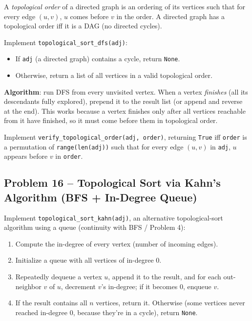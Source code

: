 \documentclass[11pt]{article}
\begin{document}
A \emph{topological order} of a directed graph is an ordering of its vertices such that
for every edge $(u,v)$, $u$ comes before $v$ in the order. A directed graph has a
topological order iff it is a DAG (no directed cycles).

Implement \texttt{topological\_sort\_dfs(adj)}:
\begin{itemize}
    \item If \texttt{adj} (a directed graph) contains a cycle, return \texttt{None}.
    \item Otherwise, return a list of all vertices in a valid topological order.
\end{itemize}

\textbf{Algorithm}: run DFS from every unvisited vertex. When a vertex \emph{finishes}
(all its descendants fully explored), prepend it to the result list (or append and
reverse at the end). This works because a vertex finishes only after all vertices
reachable from it have finished, so it must come before them in topological order.

Implement \texttt{verify\_topological\_order(adj, order)}, returning \texttt{True} iff
\texttt{order} is a permutation of \texttt{range(len(adj))} such that for every edge
$(u,v)$ in \texttt{adj}, $u$ appears before $v$ in \texttt{order}.

\subsection*{Problem 16 -- Topological Sort via Kahn's Algorithm (BFS + In-Degree Queue)}

Implement \texttt{topological\_sort\_kahn(adj)}, an alternative topological-sort
algorithm using a queue (continuity with BFS / Problem 4):

\begin{enumerate}
    \item Compute the in-degree of every vertex (number of incoming edges).
    \item Initialize a queue with all vertices of in-degree 0.
    \item Repeatedly dequeue a vertex $u$, append it to the result, and for each
    out-neighbor $v$ of $u$, decrement $v$'s in-degree; if it becomes 0, enqueue $v$.
    \item If the result contains all $n$ vertices, return it. Otherwise (some vertices
    never reached in-degree 0, because they're in a cycle), return \texttt{None}.
\end{enumerate}
\end{document}
